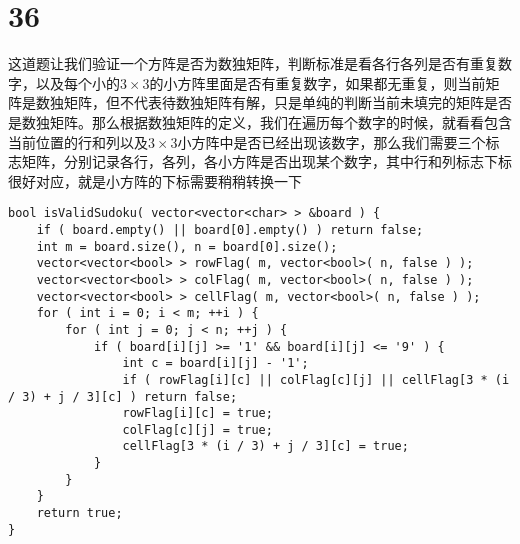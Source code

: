 \documentclass[12pt,a4paper]{article}
\begin{document}
\section{36}
\begin{CJK}{UTF8}{gbsn}
这道题让我们验证一个方阵是否为数独矩阵，判断标准是看各行各列是否有重复数字，以及每个小的$3\times3$的小方阵里面是否有重复数字，如果都无重复，则当前矩阵是数独矩阵，但不代表待数独矩阵有解，只是单纯的判断当前未填完的矩阵是否是数独矩阵。那么根据数独矩阵的定义，我们在遍历每个数字的时候，就看看包含当前位置的行和列以及$3\times3$小方阵中是否已经出现该数字，那么我们需要三个标志矩阵，分别记录各行，各列，各小方阵是否出现某个数字，其中行和列标志下标很好对应，就是小方阵的下标需要稍稍转换一下
\end{CJK}
\begin{lstlisting}
bool isValidSudoku( vector<vector<char> > &board ) {
	if ( board.empty() || board[0].empty() ) return false;
	int m = board.size(), n = board[0].size();
	vector<vector<bool> > rowFlag( m, vector<bool>( n, false ) );
	vector<vector<bool> > colFlag( m, vector<bool>( n, false ) );
	vector<vector<bool> > cellFlag( m, vector<bool>( n, false ) );
	for ( int i = 0; i < m; ++i ) {
		for ( int j = 0; j < n; ++j ) {
			if ( board[i][j] >= '1' && board[i][j] <= '9' ) {
				int c = board[i][j] - '1';
				if ( rowFlag[i][c] || colFlag[c][j] || cellFlag[3 * (i / 3) + j / 3][c] ) return false;
				rowFlag[i][c] = true;
				colFlag[c][j] = true;
				cellFlag[3 * (i / 3) + j / 3][c] = true;
			}
		}
	}
	return true;
}
\end{lstlisting}
\end{document}
